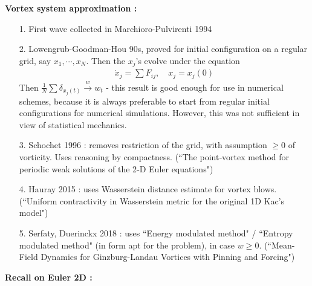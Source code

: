 \documentclass[12pt,a4paper]{extarticle}
\begin{document}
\textbf{Vortex system approximation :} 
\begin{itemize}
\item[1.] First wave collected in Marchioro-Pulvirenti 1994
\item[2.] Lowengrub-Goodman-Hou 90s, proved for initial configuration on a regular grid, say $x_1, \cdots, x_N$. Then the $x_j$'s evolve under the equation
\begin{align*}
\dot{x}_j = \sum F_{ij}, \quad x_j = x_j(0)
\end{align*}
Then $\frac{1}{N}\sum \delta_{x_j(t)} \xrightarrow{w} w_t$ - this result is good enough for use in numerical schemes, because it is always preferable to start from regular initial configurations for numerical simulations. However, this was not sufficient in view of statistical mechanics.
\item[3.]  Schochet 1996 : removes restriction of the grid, with assumption $\geq 0$ of vorticity. Uses reasoning by compactness. (``The point‐vortex method for periodic weak solutions of the 2‐D Euler equations")
\item[4.] Hauray 2015 : uses Wasserstein distance estimate for vortex blows. (``Uniform contractivity in Wasserstein metric for the original 1D Kac's model")
\item[5.] Serfaty, Duerinckx 2018 : uses ``Energy modulated method" / ``Entropy modulated method" (in form apt for the problem), in case $w\geq 0$. (``Mean-Field Dynamics for Ginzburg-Landau Vortices with Pinning and Forcing")
\end{itemize}
\s

\s

\textbf{Recall on Euler 2D :} 
\end{document}
